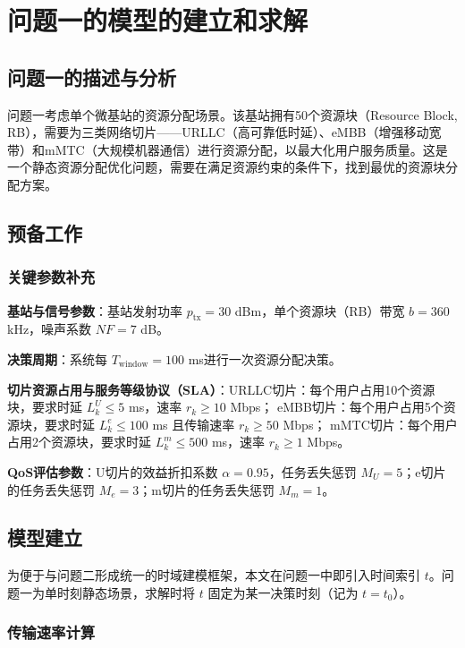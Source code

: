 \section{问题一的模型的建立和求解}
\subsection{问题一的描述与分析}

问题一考虑单个微基站的资源分配场景。该基站拥有50个资源块（Resource Block, RB），需要为三类网络切片——URLLC（高可靠低时延）、eMBB（增强移动宽带）和mMTC（大规模机器通信）进行资源分配，以最大化用户服务质量。这是一个静态资源分配优化问题，需要在满足资源约束的条件下，找到最优的资源块分配方案。

\subsection{预备工作}
\subsubsection{关键参数补充}

\textbf{基站与信号参数}：基站发射功率 $p_{\text{tx}} = 30$ dBm，单个资源块（RB）带宽 $b = 360$ kHz，噪声系数 $NF = 7$ dB。

\textbf{决策周期}：系统每 $T_{\text{window}} = 100$ ms进行一次资源分配决策。

\textbf{切片资源占用与服务等级协议（SLA）}：URLLC切片：每个用户占用10个资源块，要求时延 $L_k^U \leq 5$ ms，速率 $r_k \geq 10$ Mbps；
eMBB切片：每个用户占用5个资源块，要求时延 $L_k^e \leq 100$ ms 且传输速率 $r_k \geq 50$ Mbps；
mMTC切片：每个用户占用2个资源块，要求时延 $L_k^m \leq 500$ ms，速率 $r_k \geq 1$ Mbps。


\textbf{QoS评估参数}：U切片的效益折扣系数 $\alpha = 0.95$，任务丢失惩罚 $M_U = 5$；e切片的任务丢失惩罚 $M_e = 3$；m切片的任务丢失惩罚 $M_m = 1$。



\subsection{模型建立}

为便于与问题二形成统一的时域建模框架，本文在问题一中即引入时间索引 $t$。问题一为单时刻静态场景，求解时将 $t$ 固定为某一决策时刻（记为 $t=t_0$）。

\subsubsection{传输速率计算}

